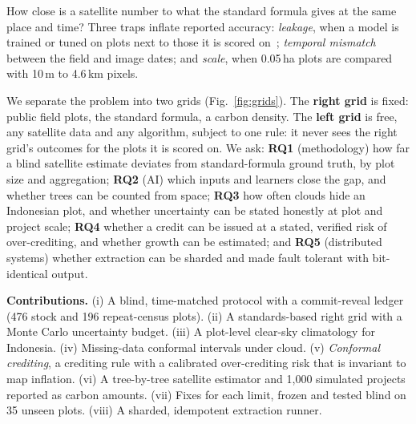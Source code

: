 \documentclass[conference,a4paper]{IEEEtran}
\begin{document}
How close is a satellite number to what the standard formula gives at the same place and time? Three traps inflate reported accuracy: \emph{leakage}, when a model is trained or tuned on plots next to those it is scored on~\cite{ploton2020spatial}; \emph{temporal mismatch} between the field and image dates; and \emph{scale}, when 0.05\,ha plots are compared with 10\,m to 4.6\,km pixels.

We separate the problem into two grids (Fig.~\ref{fig:grids}). The \textbf{right grid} is fixed: public field plots, the standard formula, a carbon density. The \textbf{left grid} is free, any satellite data and any algorithm, subject to one rule: it never sees the right grid's outcomes for the plots it is scored on. We ask: \textbf{RQ1} (methodology) how far a blind satellite estimate deviates from standard-formula ground truth, by plot size and aggregation; \textbf{RQ2} (AI) which inputs and learners close the gap, and whether trees can be counted from space; \textbf{RQ3} how often clouds hide an Indonesian plot, and whether uncertainty can be stated honestly at plot and project scale; \textbf{RQ4} whether a credit can be issued at a stated, verified risk of over-crediting, and whether growth can be estimated; and \textbf{RQ5} (distributed systems) whether extraction can be sharded and made fault tolerant with bit-identical output.

\textbf{Contributions.} (i) A blind, time-matched protocol with a commit-reveal ledger (476 stock and 196 repeat-census plots). (ii) A standards-based right grid with a Monte Carlo uncertainty budget. (iii) A plot-level clear-sky climatology for Indonesia. (iv) Missing-data conformal intervals under cloud. (v) \emph{Conformal crediting}, a crediting rule with a calibrated over-crediting risk that is invariant to map inflation. (vi) A tree-by-tree satellite estimator and 1{,}000 simulated projects reported as carbon amounts. (vii) Fixes for each limit, frozen and tested blind on 35 unseen plots. (viii) A sharded, idempotent extraction runner.
\end{document}
